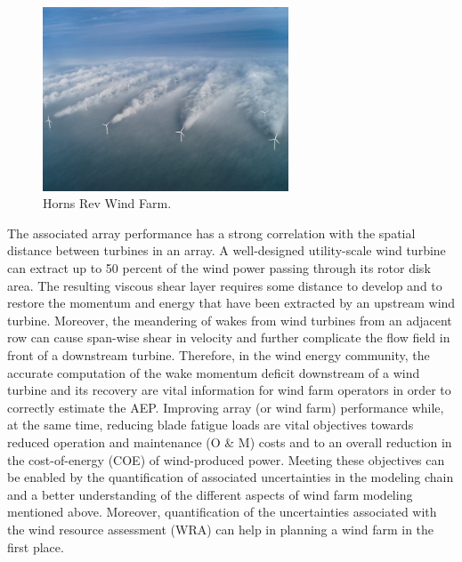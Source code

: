 \documentclass[]{aiaa-tc}%
\begin{document}
\begin{figure}
\centering
 \includegraphics[width=0.65\textwidth]{HornsRev.png}
 \caption{Horns Rev Wind Farm.}
 \label{f:HornsRev}
\end{figure}

The associated array performance has a strong correlation with the spatial distance between turbines in an array. A well-designed utility-scale wind turbine can extract up to 50 percent of the wind power passing through its rotor disk area. The resulting viscous shear layer requires some distance to develop and to restore the momentum and energy that have been extracted by an upstream wind turbine. Moreover, the meandering of wakes from wind turbines from an adjacent row can cause span-wise shear in velocity and further complicate the flow field in front of a downstream turbine. Therefore, in the wind energy community, the accurate computation of the wake momentum deficit downstream of a wind turbine and its recovery are vital information for wind farm operators in order to correctly estimate the AEP. Improving array (or wind farm) performance while, at the same time, reducing blade fatigue loads are vital objectives towards reduced operation and maintenance (O \& M) costs and to an overall reduction in the cost-of-energy (COE) of wind-produced power. Meeting these objectives can be enabled by the quantification of associated uncertainties in the modeling chain and a better understanding of the different aspects of wind farm modeling mentioned above. Moreover, quantification of the uncertainties associated with the wind resource assessment (WRA) can help in planning a wind farm in the first place.
\end{document}
